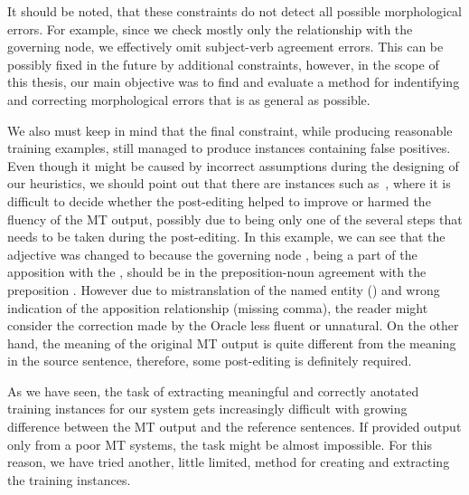 It should be noted, that these constraints do not detect all possible morphological errors. For example,
since we check mostly only the relationship with the governing node, we effectively omit subject-verb
agreement errors. This can be possibly
fixed in the future by additional constraints, however, in the scope of this thesis, our main objective was
to find and evaluate a method for indentifying and correcting morphological errors that is as general as possible.

We also must keep in mind that the final constraint, while producing reasonable training examples,
still managed to produce instances containing false positives. Even though it might be caused by
incorrect assumptions during the designing of our heuristics, we should point out that there
are instances such as~, where it is difficult to decide whether the post-editing
helped to improve or harmed the fluency of the MT output, possibly due to being only one of the
several steps that needs to be taken during the post-editing.
In this example, we can see that the adjective  was changed to  because the
governing node , being a part of the apposition with the , should
be in the preposition-noun agreement with the preposition . However due to mistranslation of the
named entity () and wrong indication of the apposition relationship (missing comma),
the reader might consider the correction made by the Oracle less fluent or unnatural. On the other hand,
the meaning of the original MT output is quite different from the meaning in the source sentence, therefore,
some post-editing is definitely required.

As we have seen, the task of extracting meaningful and correctly anotated training instances for our system
 gets increasingly difficult with growing difference between the MT output and the reference sentences.
If provided output only from a poor MT systems, the task might be almost impossible. For this reason,
we have tried another, little limited, method for creating and extracting the training instances.

